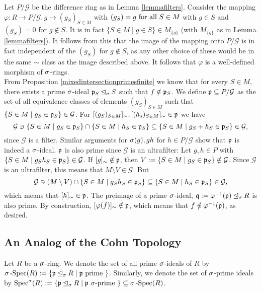 \begin{theorem}
\begin{bew}
Let $P/\mathcal{G}$ be the difference ring as in Lemma \ref{lemmafilters}. Consider the mapping $\varphi: R \rightarrow P/\mathcal{G}, g \mapsto (g_S)_{S \in M}$ with $(g_S) = g \text{ for all } S \in M$ with $g \in S$ and $(g_S) = 0$ for $g \notin S$. 
It is in fact $\{ S \in M \mid g \in S \} \in M_{\{g\}}$ (with $M_{\{g\}}$ as in Lemma \ref{lemmafilters}). It follows from this that the image of the mapping onto $P/\mathcal{G}$ is in fact independent of the $(g_S)$ for $g \notin S$, as any other choice of these would be in the same $\sim$ class as the image described above.
It follows that $\varphi$ is a well-defined morphism of $\sigma$-rings. \\
\indent From Proposition \ref{mixedintersectionprimesfinite} we know that for every $S \in M$, there exists a prime $\sigma$-ideal $\mathfrak{p}_S \unlhd_{\sigma} S$ such that $f \notin \mathfrak{p}_S$. 
We define $\mathfrak{p} \subseteq P/\mathcal{G}$ as the set of all equivalence classes of elements $(g_S)_{S \in M}$ such that $\{ S \in M \mid g_S \in \mathfrak{p}_S \} \in \mathcal{G}$. 
For $[(g_S)_{S \in M}]_{\sim}, [(h_s)_{S \in M}]_{\sim} \in \mathfrak{p}$ we have $$ \mathcal{G} \ni \{ S \in M \mid  g_S \in \mathfrak{p}_S \} \cap  \{ S \in M \mid  h_S \in \mathfrak{p}_S \} \subseteq \{ S \in M \mid  g_S + h_S \in \mathfrak{p}_S \} \in \mathcal{G},$$
since $\mathcal{G}$ is a filter. Similar arguments for $\sigma(g), gh$ for $h \in P/\mathcal{G}$ show that $\mathfrak{p}$ is indeed a $\sigma$-ideal. $\mathfrak{p}$ is also prime since $\mathcal{G}$ is an ultrafilter:
Let $g,h \in P$ with $\{ S \in M \mid g_Sh_S \in \mathfrak{p}_S \} \in \mathcal{G}$. If $[g]_\sim \notin \mathfrak{p}$, then $V:= \{ S \in M \mid g_S \in \mathfrak{p}_S \} \notin \mathcal{G}$. Since $\mathcal{G}$ is an ultrafilter, 
this means that $M \setminus V \in \mathcal{G}$. But $$\mathcal{G} \ni (M \setminus V) \cap \{ S \in M \mid g_S h_S \in \mathfrak{p}_S \} \subseteq \{ S \in M \mid h_S \in \mathfrak{p}_S \} \in \mathcal{G},$$
which means that $[h]_\sim \in \mathfrak{p}$. The preimage of a prime $\sigma$-ideal, $\mathfrak{q} := \varphi^{-1}(\mathfrak{p}) \unlhd_{\sigma} R$ is also prime. By construction, $[\varphi(f)]_\sim \notin \mathfrak{p}$, which means that $f \notin \varphi^{-1}(\mathfrak{p})$, as desired. 

\end{bew}
\end{theorem}

\subsection{An Analog of the Cohn Topology}

\begin{defn}
Let $R$ be a $\sigma$-ring. We denote the set of all prime $\sigma$-ideals of $R$ by $\sigma\operatorname{-Spec}(R):= \{ \mathfrak{p} \unlhd_{\sigma} R \mid \mathfrak{p} \text{ prime }\}$. Similarly, we denote the set of $\sigma$-prime ideals by $\operatorname{Spec}^\sigma(R):= \{ \mathfrak{p} \unlhd_{\sigma} R \mid \mathfrak{p} ~ \sigma\text{-prime }\} \subseteq \sigma\operatorname{-Spec}(R)$.
\index{$\sSpec$} \index{$\Spec^\s$}
\end{defn}


